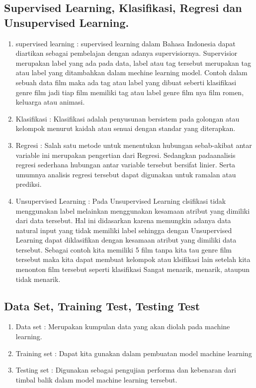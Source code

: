 \subsection{Supervised Learning, Klasifikasi, Regresi dan Unsupervised Learning.}
\begin{enumerate}
\item supervised learning : supervised learning dalam Bahasa Indonesia dapat diartikan sebagai pembelajan dengan adanya supervisiornya. Supervisior merupakan label yang ada pada data, label atau tag tersebut merupakan tag atau label yang ditambahkan dalam mechine learning model. Contoh dalam sebuah data film maka ada tag atau label yang dibuat seberti klasifikasi genre film jadi tiap film memiliki tag atau label genre film nya film romen, keluarga atau animasi.
\item Klasifikasi : Klasifikasi adalah penyusunan bersistem pada golongan atau kelompok menurut kaidah atau senuai dengan standar yang diterapkan.
\item Regresi : Salah satu metode untuk menentukan hubungan sebab-akibat antar variable ini merupakan pengertian dari Regresi. Sedangkan padaanalisis regresi sederhana hubungan antar variable tersebut bersifat linier. Serta umumnya analisis regresi tersebut dapat digunakan untuk ramalan atau prediksi. 
\item Unsupervised Learning : Pada Unsupervised Learning clsifikasi tidak menggunakan label melainkan menggunakan kesamaan atribut yang dimiliki dari data tersebut. Hal ini didasarkan karena memungkin adanya data natural input yang tidak memiliki label sehingga dengan Unsupervised Learning dapat diklasifikan dengan kesamaan atribut yang dimiliki data tersebut. Sebagai contoh kita memiliki 5 film tanpa kita tau genre film tersebut maka kita dapat membuat kelompok atau klsifikasi lain setelah kita menonton film tersebut seperti klasifikasi Sangat menarik, menarik, ataupun tidak menarik.
\end{enumerate}

\subsection{Data Set, Training Test, Testing Test}
\begin{enumerate}
    \item Data set : Merupakan kumpulan data yang akan diolah pada machine learning.
    \item Training set : Dapat kita gunakan dalam pembuatan model machine learning
    \item Testing set : Digunakan sebagai pengujian performa dan kebenaran dari timbal balik dalam model machine learning tersebut.
\end{enumerate}

